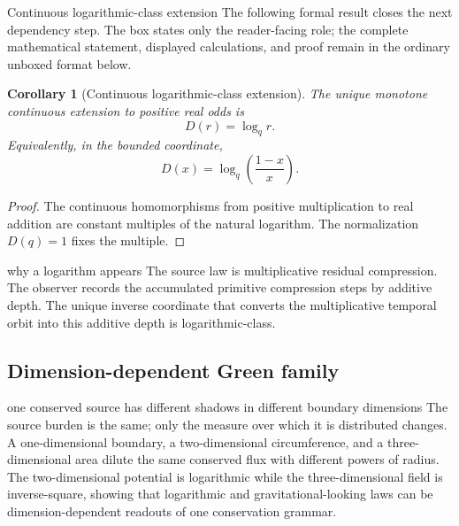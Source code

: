 \documentclass[11pt]{article}
\numberwithin{equation}{section}
\newtheorem{corollary}[definition]{Corollary}
\theoremstyle{remark}
\begin{document}
\begin{proofguide}{Continuous logarithmic-class extension}
The following formal result closes the next dependency step. The box states only the reader-facing role; the complete mathematical statement, displayed calculations, and proof remain in the ordinary unboxed format below.
\end{proofguide}
\begin{corollary}[Continuous logarithmic-class extension]
The unique monotone continuous extension to positive real odds is
\begin{equation}
D(r)=\log_q r.
\end{equation}
Equivalently, in the bounded coordinate,
\begin{equation}
D(x)=\log_q\left(\frac{1-x}{x}\right).
\end{equation}
\end{corollary}

\begin{proof}
The continuous homomorphisms from positive multiplication to real addition are constant multiples of the natural logarithm. The normalization $D(q)=1$ fixes the multiple.
\end{proof}

\begin{interpretivebridge}{why a logarithm appears}
The source law is multiplicative residual compression. The observer records the accumulated primitive compression steps by additive depth. The unique inverse coordinate that converts the multiplicative temporal orbit into this additive depth is logarithmic-class.
\end{interpretivebridge}

\subsection{Dimension-dependent Green family}
\begin{interpretivebridge}{one conserved source has different shadows in different boundary dimensions}
The source burden is the same; only the measure over which it is distributed changes. A one-dimensional boundary, a two-dimensional circumference, and a three-dimensional area dilute the same conserved flux with different powers of radius. The two-dimensional potential is logarithmic while the three-dimensional field is inverse-square, showing that logarithmic and gravitational-looking laws can be dimension-dependent readouts of one conservation grammar.
\end{interpretivebridge}
\end{document}
